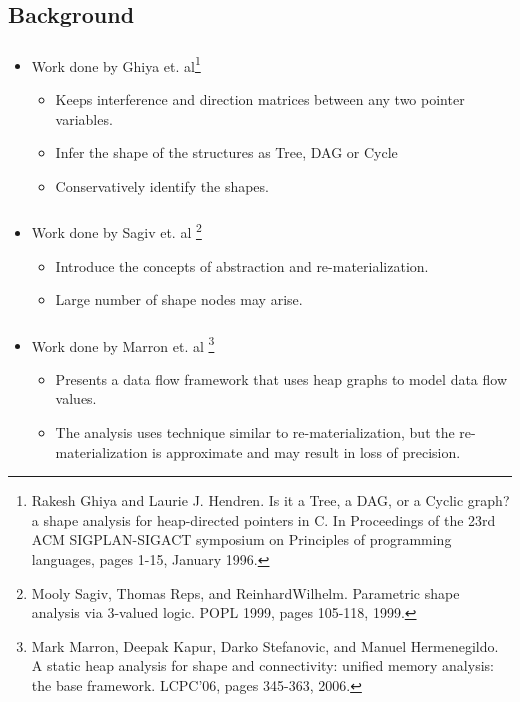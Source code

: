 \documentclass[mathserif,10pt]{beamer}
\begin{document}
\subsection{Background}
\frame
{
	\frametitle{\subsecname}
	\begin{itemize}
	\item Work done by Ghiya et. al\footnote{Rakesh Ghiya and Laurie J. Hendren. Is it a Tree, a DAG, or a Cyclic graph? 
	a shape analysis for heap-directed pointers in C. In Proceedings of the 23rd ACM
	SIGPLAN-SIGACT symposium on Principles of programming languages, pages 1-15, January 1996.}
	
	\begin{itemize}
	\item Keeps interference and direction matrices between any two 
			pointer variables.
	\item Infer the shape of the structures as Tree, DAG or Cycle
	\item Conservatively identify the shapes.
	\end{itemize}
	\end{itemize}
}

\frame
{
	\frametitle{\subsecname}
	\begin{itemize}
	\item Work done by Sagiv et. al \footnote{Mooly Sagiv, Thomas Reps, and ReinhardWilhelm. Parametric shape analysis via
	3-valued logic. POPL 1999, pages 105-118, 1999.}
	
	\begin{itemize}
	\item Introduce the concepts of abstraction and re-materialization.
	\item Large number of shape nodes may arise. 
	\end{itemize}
	\end{itemize}
		
}

\frame
{

	\frametitle{\subsecname}
	\begin{itemize}
	\item Work done by Marron et. al \footnote{ Mark Marron, Deepak Kapur, Darko Stefanovic, and Manuel Hermenegildo. A
static heap analysis for shape and connectivity: unified memory analysis: the base
framework. LCPC'06, pages 345-363, 2006.} 
	
	\begin{itemize}
	\item Presents a data flow framework that uses heap graphs to model data flow values.
	\item The analysis uses technique similar to re-materialization, but the re-materialization is approximate and 
	may result in loss of precision.
	\end{itemize}
	\end{itemize}
		
}
\end{document}
